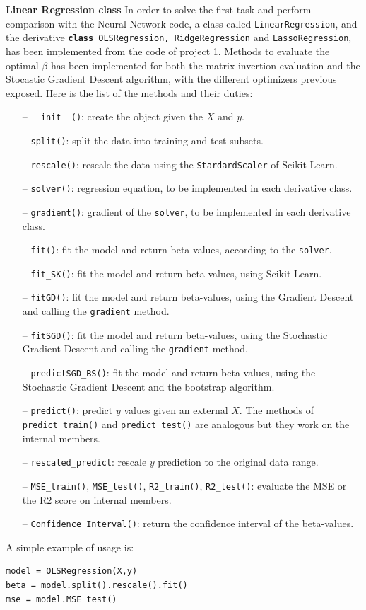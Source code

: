 \documentclass[english,notitlepage,reprint,nofootinbib]{revtex4-1}  %
\begin{document}
\textbf{Linear Regression class}
In order to solve the first task and perform comparison with the Neural Network code, a class called \texttt{LinearRegression}, and the derivative \texttt{\textbf{class} OLSRegression, RidgeRegression} and \texttt{LassoRegression}, has been implemented from the code of project 1. Methods to evaluate the optimal $\beta$ has been implemented for both the matrix-invertion evaluation and the Stocastic Gradient Descent algorithm, with the different optimizers previous exposed.
Here is the list of the methods and their duties:
\begin{itemize}
    \item[–] \texttt{\_\_init\_\_()}: create the object given the $X$ and $y$.
    \item[–] \texttt{split()}: split the data into training and test subsets.
    \item[–] \texttt{rescale()}: rescale the data using the \texttt{StardardScaler} of Scikit-Learn.
    \item[–] \texttt{solver()}: regression equation, to be implemented in each derivative class.
    \item[–] \texttt{gradient()}: gradient of the \texttt{solver}, to be implemented in each derivative class.
    \item[–] \texttt{fit()}: fit the model and return beta-values, according to the \texttt{solver}.
    \item[–] \texttt{fit\_SK()}: fit the model and return beta-values, using Scikit-Learn.
    \item[–] \texttt{fitGD()}: fit the model and return beta-values, using the Gradient Descent and calling the \texttt{gradient} method.
    \item[–] \texttt{fitSGD()}: fit the model and return beta-values, using the Stochastic Gradient Descent and calling the \texttt{gradient} method.
    \item[–] \texttt{predictSGD\_BS()}: fit the model and return beta-values, using the Stochastic Gradient Descent and the bootstrap algorithm.
    \item[–] \texttt{predict()}: predict $y$ values given an external $X$. The methods of \texttt{predict\_train()} and \texttt{predict\_test()} are analogous but they work on the internal members.
    \item[–] \texttt{rescaled\_predict}: rescale $y$ prediction to the original data range.
    \item[–] \texttt{MSE\_train()}, \texttt{MSE\_test()}, \texttt{R2\_train()}, \texttt{R2\_test()}: evaluate the MSE or the R2 score on internal members.
    \item[–] \texttt{Confidence\_Interval()}: return the confidence interval of the beta-values.
\end{itemize}
A simple example of usage is:
\begin{verbatim}
model = OLSRegression(X,y)
beta = model.split().rescale().fit()
mse = model.MSE_test()
\end{verbatim}
\end{document}
